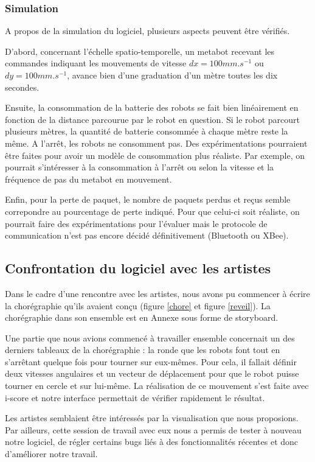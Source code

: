 \subsubsection{Simulation}

A propos de la simulation du logiciel, plusieurs aspects peuvent être vérifiés.

D'abord, concernant l'échelle spatio-temporelle, un metabot recevant les commandes indiquant les mouvements de vitesse $dx=100 mm.s^{-1}$ ou $dy=100 mm.s^{-1}$, avance bien d'une graduation d'un mètre toutes les dix secondes.

Ensuite, la consommation de la batterie des robots se fait bien linéairement en fonction de la distance parcourue par le robot en question. Si le robot parcourt plusieurs mètres, la quantité de batterie consommée à chaque mètre reste la même. A l'arrêt, les robots ne consomment pas. Des expérimentations pourraient être faites pour avoir un modèle de consommation plus réaliste. Par exemple, on pourrait s'intéresser à la consommation à l'arrêt ou selon la vitesse et la fréquence de pas du metabot en mouvement.

Enfin, pour la perte de paquet, le nombre de paquets perdus et reçus semble correpondre au pourcentage de perte indiqué. Pour que celui-ci soit réaliste, on pourrait faire des expérimentations pour l'évaluer mais le protocole de communication n'est pas encore décidé définitivement (Bluetooth ou XBee). 

\subsection{Confrontation du logiciel avec les artistes}

Dans le cadre d'une rencontre avec les artistes, nous avons pu commencer à écrire la chorégraphie qu'ils avaient conçu (figure \ref{chore} et figure \ref{reveil}).  La chorégraphie dans son ensemble est en Annexe sous forme de storyboard. 

Une partie que nous avions commencé à travailler ensemble concernait un des derniers tableaux de la chorégraphie : la ronde que les robots font tout en s'arrêtant quelque fois pour tourner sur eux-mêmes. Pour cela, il fallait définir deux vitesses angulaires et un vecteur de déplacement pour que le robot puisse tourner en cercle et sur lui-même. La réalisation de ce mouvement s'est faite avec i-score et notre interface permettait de vérifier rapidement le résultat.

Les artistes semblaient être intéressés par la visualisation que nous proposions. Par ailleurs, cette session de travail avec eux nous a permis de tester à nouveau notre logiciel, de régler certains bugs liés à des fonctionnalités récentes et donc d'améliorer notre travail. 

